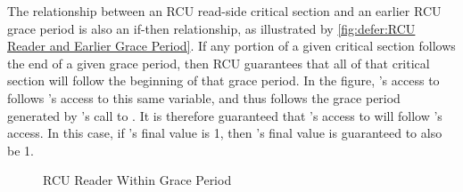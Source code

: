 The relationship between an RCU read-side critical section and an earlier
RCU grace period is also an if-then relationship, as illustrated by
\cref{fig:defer:RCU Reader and Earlier Grace Period}.
If any portion of a given critical section follows the end of
a given grace period, then RCU guarantees that all of that critical
section will follow the beginning of that grace period.
In the figure, 's access to  follows 's access
to this same variable, and thus follows the grace period generated by
's call to .
It is therefore guaranteed that 's access to  will follow
's access.
In this case, if 's final value is 1, then 's final value
is guaranteed to also be 1.

\QuickQuizEnd

\begin{figure}
\centering
{}
\caption{RCU Reader Within Grace Period}
\label{fig:defer:RCU Reader Within Grace Period}
\end{figure}


